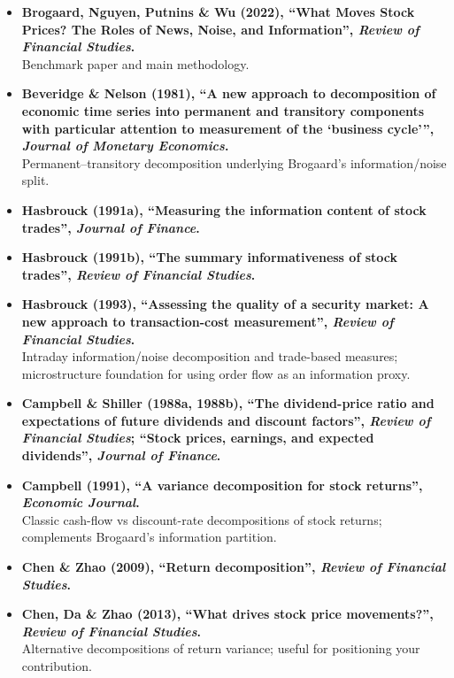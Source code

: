 \documentclass[11pt,a4paper]{article}
\begin{document}
\begin{itemize}
  \item \textbf{Brogaard, Nguyen, Putnins \& Wu (2022), ``What Moves Stock Prices? The Roles of News, Noise, and Information'', \emph{Review of Financial Studies}.}\\
  Benchmark paper and main methodology. 

  \item \textbf{Beveridge \& Nelson (1981), ``A new approach to decomposition of economic time series into permanent and transitory components with particular attention to measurement of the `business cycle''', \emph{Journal of Monetary Economics}.}\\
  Permanent--transitory decomposition underlying Brogaard's information/noise split.

  \item \textbf{Hasbrouck (1991a), ``Measuring the information content of stock trades'', \emph{Journal of Finance}.}
  \item \textbf{Hasbrouck (1991b), ``The summary informativeness of stock trades'', \emph{Review of Financial Studies}.}
  \item \textbf{Hasbrouck (1993), ``Assessing the quality of a security market: A new approach to transaction-cost measurement'', \emph{Review of Financial Studies}.}\\
  Intraday information/noise decomposition and trade-based measures; microstructure foundation for using order flow as an information proxy.

  \item \textbf{Campbell \& Shiller (1988a, 1988b), ``The dividend-price ratio and expectations of future dividends and discount factors'', \emph{Review of Financial Studies}; ``Stock prices, earnings, and expected dividends'', \emph{Journal of Finance}.}
  \item \textbf{Campbell (1991), ``A variance decomposition for stock returns'', \emph{Economic Journal}.}\\
  Classic cash-flow vs discount-rate decompositions of stock returns; complements Brogaard's information partition.

  \item \textbf{Chen \& Zhao (2009), ``Return decomposition'', \emph{Review of Financial Studies}.}
  \item \textbf{Chen, Da \& Zhao (2013), ``What drives stock price movements?'', \emph{Review of Financial Studies}.}\\
  Alternative decompositions of return variance; useful for positioning your contribution.


\end{itemize}
\end{document}
